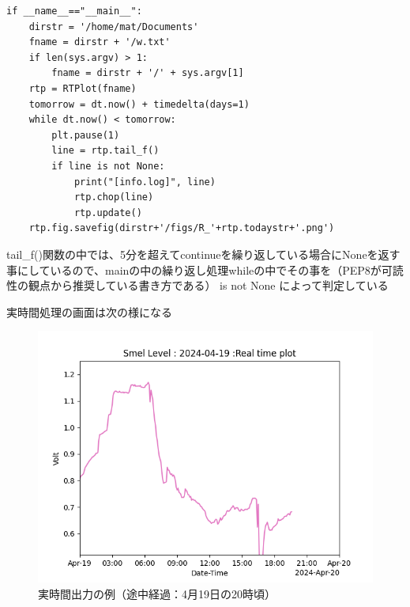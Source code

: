 \documentclass[12pt,a4paper,uplatex]{jsarticle}
\begin{document}
\begin{breakbox}
\begin{verbatim}
if __name__=="__main__":
    dirstr = '/home/mat/Documents'
    fname = dirstr + '/w.txt'
    if len(sys.argv) > 1:
        fname = dirstr + '/' + sys.argv[1]
    rtp = RTPlot(fname)
    tomorrow = dt.now() + timedelta(days=1)
    while dt.now() < tomorrow:
        plt.pause(1)
        line = rtp.tail_f()
        if line is not None:
            print("[info.log]", line)
            rtp.chop(line)
            rtp.update()
    rtp.fig.savefig(dirstr+'/figs/R_'+rtp.todaystr+'.png')
	\end{verbatim}
\end{breakbox}

tail\_f()関数の中では、5分を超えてcontinueを繰り返している場合にNoneを返す事にしているので、mainの中の繰り返し処理whileの中でその事を（PEP8が可読性の観点から推奨している書き方である） is not None によって判定している

実時間処理の画面は次の様になる

\begin{figure}[htbp]
	\begin{minipage}[b]{1.0\linewidth}
		\centering
		\includegraphics[keepaspectratio, scale=0.8]{figs/png/Figure_1.png}
		\caption{実時間出力の例（途中経過：4月19日の20時頃）}
	\end{minipage}
\end{figure}
\end{document}
